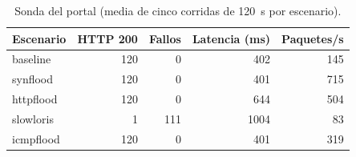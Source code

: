 \begin{table}[H]
\centering
\small
\caption{Sonda del portal (media de cinco corridas de 120~s por escenario).}
\label{tbl:sonda}
\setlength{\tabcolsep}{4pt}
\begin{tabular}{lrrrr}
\hline
Escenario & HTTP 200 & Fallos & Latencia (ms) & Paquetes/s \\
\hline
baseline & 120 & 0 & 402 & 145 \\
synflood & 120 & 0 & 401 & 715 \\
httpflood & 120 & 0 & 644 & 504 \\
slowloris & 1 & 111 & 1004 & 83 \\
icmpflood & 120 & 0 & 401 & 319 \\
\hline
\end{tabular}
\end{table}
